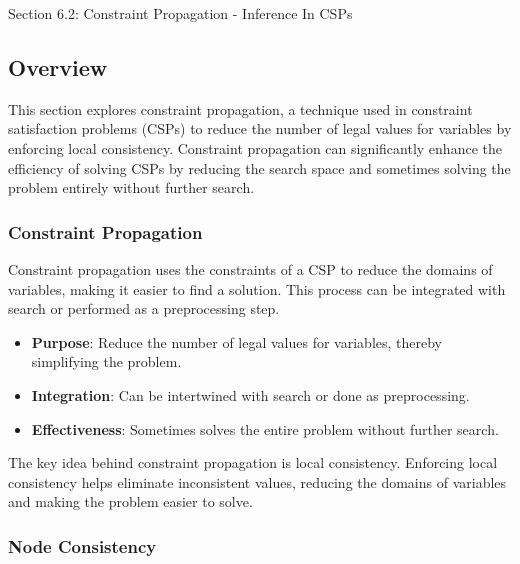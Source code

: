 \begin{notes}{Section 6.2: Constraint Propagation - Inference In CSPs}
    \subsection*{Overview}

    This section explores constraint propagation, a technique used in constraint satisfaction problems (CSPs) to reduce the number of legal values for variables by enforcing local consistency. Constraint 
    propagation can significantly enhance the efficiency of solving CSPs by reducing the search space and sometimes solving the problem entirely without further search.
    
    \subsubsection*{Constraint Propagation}
    
    Constraint propagation uses the constraints of a CSP to reduce the domains of variables, making it easier to find a solution. This process can be integrated with search or performed as a preprocessing step.
    
    \begin{highlight}
    
        \begin{itemize}
            \item \textbf{Purpose}: Reduce the number of legal values for variables, thereby simplifying the problem.
            \item \textbf{Integration}: Can be intertwined with search or done as preprocessing.
            \item \textbf{Effectiveness}: Sometimes solves the entire problem without further search.
        \end{itemize}
    
    \end{highlight}
    
    The key idea behind constraint propagation is local consistency. Enforcing local consistency helps eliminate inconsistent values, reducing the domains of variables and making the problem easier to solve.
    
    \subsubsection*{Node Consistency}
    

\end{notes}
